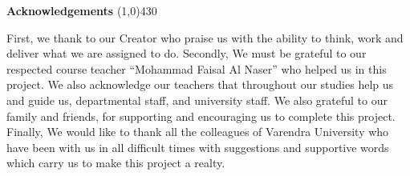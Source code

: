 \begin{center}
{\huge \bf Acknowledgements}
\line(1,0){430}
\end{center}

First, we thank to our Creator who praise us with the ability to think, work and deliver what we
are assigned to do. Secondly, We must be grateful to our respected course teacher “Mohammad
Faisal Al Naser” who helped us in this project. We also acknowledge our teachers that throughout our
studies help us and guide us, departmental staff, and university staff. We also grateful to our
family and friends, for supporting and encouraging us to complete this project. Finally, We
would like to thank all the colleagues of Varendra University who have been with us in all
difficult times with suggestions and supportive words which carry us to make this project a
realty.